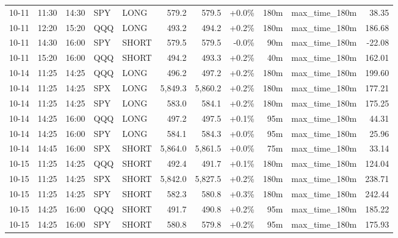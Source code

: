 \documentclass[11pt,a4paper,twoside]{article}
\begin{document}
\begin{center}
\begin{longtable}{>{\color{txtmain}}l l l l l r r r r >{\color{txtmain}}l r}
10-11 & 11:30 & 14:30 & SPY & LONG & 579.2 & 579.5 & \textcolor{wingreen}{+0.0\%} & 180m & max\_time\_180m & \textcolor{wingreen}{38.35} \\
10-11 & 12:20 & 15:20 & QQQ & LONG & 493.2 & 494.2 & \textcolor{wingreen}{+0.2\%} & 180m & max\_time\_180m & \textcolor{wingreen}{186.68} \\
10-11 & 14:30 & 16:00 & SPY & SHORT & 579.5 & 579.5 & \textcolor{lossred}{-0.0\%} & 90m & max\_time\_180m & \textcolor{lossred}{-22.08} \\
10-11 & 15:20 & 16:00 & QQQ & SHORT & 494.2 & 493.3 & \textcolor{wingreen}{+0.2\%} & 40m & max\_time\_180m & \textcolor{wingreen}{162.01} \\
10-14 & 11:25 & 14:25 & QQQ & LONG & 496.2 & 497.2 & \textcolor{wingreen}{+0.2\%} & 180m & max\_time\_180m & \textcolor{wingreen}{199.60} \\
10-14 & 11:25 & 14:25 & SPX & LONG & 5,849.3 & 5,860.2 & \textcolor{wingreen}{+0.2\%} & 180m & max\_time\_180m & \textcolor{wingreen}{177.21} \\
10-14 & 11:25 & 14:25 & SPY & LONG & 583.0 & 584.1 & \textcolor{wingreen}{+0.2\%} & 180m & max\_time\_180m & \textcolor{wingreen}{175.25} \\
10-14 & 14:25 & 16:00 & QQQ & LONG & 497.2 & 497.5 & \textcolor{wingreen}{+0.1\%} & 95m & max\_time\_180m & \textcolor{wingreen}{44.31} \\
10-14 & 14:25 & 16:00 & SPY & LONG & 584.1 & 584.3 & \textcolor{wingreen}{+0.0\%} & 95m & max\_time\_180m & \textcolor{wingreen}{25.96} \\
10-14 & 14:45 & 16:00 & SPX & SHORT & 5,864.0 & 5,861.5 & \textcolor{wingreen}{+0.0\%} & 75m & max\_time\_180m & \textcolor{wingreen}{33.14} \\
10-15 & 11:25 & 14:25 & QQQ & SHORT & 492.4 & 491.7 & \textcolor{wingreen}{+0.1\%} & 180m & max\_time\_180m & \textcolor{wingreen}{124.04} \\
10-15 & 11:25 & 14:25 & SPX & SHORT & 5,842.0 & 5,827.5 & \textcolor{wingreen}{+0.2\%} & 180m & max\_time\_180m & \textcolor{wingreen}{238.71} \\
10-15 & 11:25 & 14:25 & SPY & SHORT & 582.3 & 580.8 & \textcolor{wingreen}{+0.3\%} & 180m & max\_time\_180m & \textcolor{wingreen}{242.44} \\
10-15 & 14:25 & 16:00 & QQQ & SHORT & 491.7 & 490.8 & \textcolor{wingreen}{+0.2\%} & 95m & max\_time\_180m & \textcolor{wingreen}{185.22} \\
10-15 & 14:25 & 16:00 & SPY & SHORT & 580.8 & 579.8 & \textcolor{wingreen}{+0.2\%} & 95m & max\_time\_180m & \textcolor{wingreen}{175.93} \\

\end{longtable}
\end{center}
\end{document}
